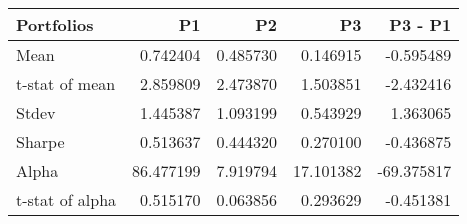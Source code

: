 \begin{tabular}{lrrrr}
\toprule
Portfolios & P1 & P2 & P3 & P3 - P1 \\
\midrule
Mean & 0.742404 & 0.485730 & 0.146915 & -0.595489 \\
t-stat of mean & 2.859809 & 2.473870 & 1.503851 & -2.432416 \\
Stdev & 1.445387 & 1.093199 & 0.543929 & 1.363065 \\
Sharpe & 0.513637 & 0.444320 & 0.270100 & -0.436875 \\
Alpha & 86.477199 & 7.919794 & 17.101382 & -69.375817 \\
t-stat of alpha & 0.515170 & 0.063856 & 0.293629 & -0.451381 \\
\bottomrule
\end{tabular}
